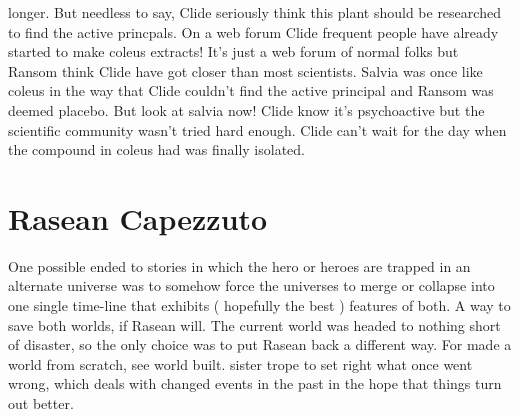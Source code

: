 \documentclass[12pt]{book}
\begin{document}
longer. But needless to say, Clide seriously think this plant should be researched to find the active princpals. On a web forum Clide frequent people have already started to make coleus extracts! It's just a web forum of normal folks but Ransom think Clide have got closer than most scientists. Salvia was once like coleus in the way that Clide couldn't find the active principal and Ransom was deemed placebo. But look at salvia now! Clide know it's psychoactive but the scientific community wasn't tried hard enough. Clide can't wait for the day when the compound in coleus had was finally isolated.



\chapter{Rasean Capezzuto}

One possible ended to stories in which the hero or heroes are trapped in an alternate universe was to somehow force the universes to merge or collapse into one single time-line that exhibits ( hopefully the best ) features of both. A way to save both worlds, if Rasean will. The current world was headed to nothing short of disaster, so the only choice was to put Rasean back a different way. For made a world from scratch, see world built. sister trope to set right what once went wrong, which deals with changed events in the past in the hope that things turn out better.
\end{document}
